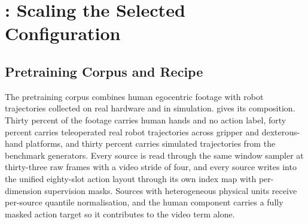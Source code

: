 \section{\sysa: Scaling the Selected Configuration}
\label{sec:alpha}

\subsection{Pretraining Corpus and Recipe}
\label{sec:corpus}

The pretraining corpus combines human egocentric footage with robot
trajectories collected on real hardware and in simulation.
 gives its composition. Thirty percent of the footage carries
human hands and no action label, forty percent carries teleoperated real robot
trajectories across gripper and dexterous-hand platforms, and thirty percent
carries simulated trajectories from the benchmark generators. Every source is
read through the same window sampler at thirty-three raw frames with a video
stride of four, and every source writes into the unified eighty-slot action
layout through its own index map with per-dimension supervision masks. Sources
with heterogeneous physical units receive per-source quantile normalisation, and
the human component carries a fully masked action target so it contributes to the
video term alone.

